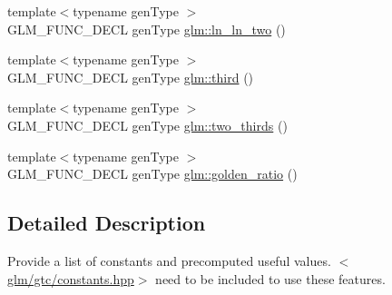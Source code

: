 \begin{DoxyCompactItemize}
{\footnotesize template$<$typename gen\-Type $>$ }\\G\-L\-M\-\_\-\-F\-U\-N\-C\-\_\-\-D\-E\-C\-L gen\-Type \hyperlink{group__gtc__constants_ga650774609debe4a90bcac449b574de2c}{glm\-::ln\-\_\-ln\-\_\-two} ()
\item 
{\footnotesize template$<$typename gen\-Type $>$ }\\G\-L\-M\-\_\-\-F\-U\-N\-C\-\_\-\-D\-E\-C\-L gen\-Type \hyperlink{group__gtc__constants_gabf280496105e0ad070287417f840ebd8}{glm\-::third} ()
\item 
{\footnotesize template$<$typename gen\-Type $>$ }\\G\-L\-M\-\_\-\-F\-U\-N\-C\-\_\-\-D\-E\-C\-L gen\-Type \hyperlink{group__gtc__constants_gadde7f2efce3b14c8b26944fbafed4a10}{glm\-::two\-\_\-thirds} ()
\item 
{\footnotesize template$<$typename gen\-Type $>$ }\\G\-L\-M\-\_\-\-F\-U\-N\-C\-\_\-\-D\-E\-C\-L gen\-Type \hyperlink{group__gtc__constants_gafd53093ef2d756333865d774bea3cdf9}{glm\-::golden\-\_\-ratio} ()
\end{DoxyCompactItemize}


\subsection{Detailed Description}
Provide a list of constants and precomputed useful values. $<$\hyperlink{constants_8hpp}{glm/gtc/constants.\-hpp}$>$ need to be included to use these features. 


